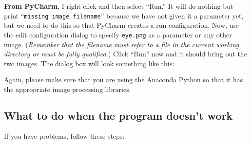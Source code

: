 \documentclass[titlepage]{tufte-book}
\newcounter{problem}
\begin{document}
{\bf From PyCharm}, I right-click and then select ``Run.'' It will do nothing but print ``{\tt missing image filename}'' because we have not given it a parameter yet, but we need to do this so that PyCharm creates a run configuration. Now, use the edit configuration dialog to specify {\tt eye.png} as a parameter or any other image. ({\em Remember that the filename must refer to a file in the current working directory or must be fully qualified.}) Click ``Run'' now and it should bring out the two images. The dialog box will look something like this:


Again, please make sure that you are using the Anaconda Python so that it has the appropriate image processing libraries.

\subsection{What to do when the program doesn't work}

If you have problems, follow these steps:
\end{document}
